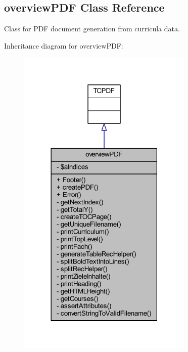 \hypertarget{classoverview_p_d_f}{\subsection{overview\+P\+D\+F Class Reference}
\label{classoverview_p_d_f}
}


Class for P\+D\+F document generation from curricula data.  




Inheritance diagram for overview\+P\+D\+F\+:
\nopagebreak
\begin{figure}[H]
\begin{center}
\leavevmode
\includegraphics[width=237pt]{classoverview_p_d_f__inherit__graph}
\end{center}
\end{figure}
